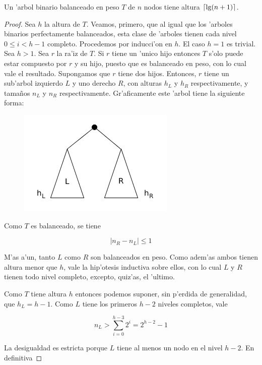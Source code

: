 \begin{teo}
	Un 'arbol binario balanceado en peso $T$ de $n$ nodos tiene altura $\lceil\lg(n + 1)\rceil$.

\begin{proof}
	Sea $h$ la altura de $T$. Veamos, primero, que al igual que los 'arboles binarios perfectamente balanceados, esta clase de 'arboles tienen cada nivel $0 \leq i < h - 1$ completo. Procedemos por inducci'on en $h$.
	El caso $h = 1$ es trivial. Sea $h > 1$. Sea $r$ la ra'iz de $T$. Si $r$ tiene un 'unico hijo entonces $T$ s'olo puede estar compuesto por $r$ y su hijo, puesto que es balanceado en peso, con lo cual vale el resultado. Supongamos que $r$ tiene dos hijos. Entonces, $r$ tiene un sub'arbol izquierdo $L$ y uno derecho $R$, con alturas $h_L$ y $h_R$ respectivamente, y tama\~nos $n_L$ y $n_R$ respectivamente. Gr'aficamente este 'arbol tiene la siguiente forma:
	
\begin{figure}[H]
	\begin{center}
	\includegraphics[scale=0.6]{imagenes/figdembp.jpg}
	\end{center}
\end{figure}

	Como $T$ es balanceado, se tiene
	
\begin{equation}
	|n_R - n_L| \leq 1	
\end{equation}

	M'as a'un, tanto $L$ como $R$ son balanceados en peso. Como adem'as ambos tienen altura menor que $h$, vale la hip'otesis inductiva sobre ellos, con lo cual $L$ y $R$ tienen todo nivel completo, excepto, quiz'as, el 'ultimo.
	
	Como $T$ tiene altura $h$ entonces podemos suponer, sin p'erdida de generalidad, que $h_L = h - 1$. Como $L$ tiene los primeros $h - 2$ niveles completos, vale
	
\[n_L > \sum_{i = 0}^{h - 3} 2^i = 2^{h - 2} - 1\]

	La desigualdad es estricta porque $L$ tiene al menos un nodo en el nivel $h - 2$. En definitiva


\end{proof}
\end{teo}
